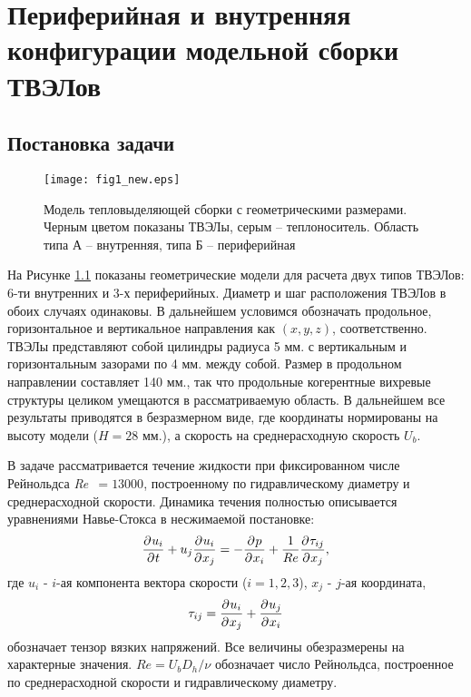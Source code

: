 \chapter{Периферийная и внутренняя конфигурации модельной сборки ТВЭЛов}\label{ch:ch4}

\section{Постановка задачи}\label{ch4:problem}

%
%
\begin{figure}[h!]
  \centering
  \texttt{[image: fig1\_new.eps]}
  \caption{Модель тепловыделяющей сборки с геометрическими размерами. 
  Черным цветом показаны ТВЭЛы, серым -- теплоноситель. Область типа А -- внутренняя, 
  типа Б -- периферийная}
  \label{fig:1}
\end{figure}
%

%
На Рисунке \ref{fig:1} показаны геометрические модели для расчета двух типов ТВЭЛов: 
6-ти внутренних и 3-х периферийных.
%
Диаметр и шаг расположения ТВЭЛов в обоих случаях одинаковы.
%
В дальнейшем условимся обозначать продольное, горизонтальное и 
вертикальное направления как $(x,y,z)$, соответственно.
%
ТВЭЛы представляют собой цилиндры радиуса 5 мм. с вертикальным и 
горизонтальным зазорами по 4 мм. между собой. 
%
Размер в продольном направлении составляет 140 мм., так что продольные когерентные 
вихревые структуры целиком умещаются в рассматриваемую область.
%
В дальнейшем все результаты приводятся в безразмерном виде, где координаты нормированы 
на высоту модели ($H=28$ мм.), а скорость на среднерасходную скорость $U_b$.
%


В задаче рассматривается течение жидкости при фиксированном числе 
Рейнольдса \textit{Re~}$ = 13000$, построенному по гидравлическому диаметру и среднерасходной скорости.
%
Динамика течения полностью описывается уравнениями Навье-Стокса в несжимаемой постановке:
\begin{equation}\label{n-stoks:dimen}
\pfrac{u_i}{t} + u_j \pfrac{u_i}{x_j}= - \pfrac{p}{x_i} + \frac{1}{Re} \pfrac{\tau_{ij}}{x_j},
\end{equation}
%
где $u_i$ - $i$-ая компонента вектора скорости ($i={1,2,3}$), $x_j$ - $j$-ая координата,
%
\begin{equation*}\label{stress:tensor}
\tau_{ij} = \frac{\partial\:\! u_i}{\partial\:\! x_j} + \frac{\partial\:\! u_j}{\partial\:\! x_i}
\end{equation*}
обозначает тензор вязких напряжений.
%
Все величины обезразмерены на характерные значения.
%
$Re = U_b D_h/\nu$ обозначает число Рейнольдса, построенное по среднерасходной скорости 
и гидравлическому диаметру.

